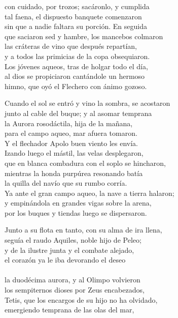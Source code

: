 con cuidado, por trozos; sacáronlo, y cumplida\\
tal faena, el dispuesto banquete comenzaron\\
sin que a nadie faltara su porción. En seguida\\
que saciaron sed y hambre, los mancebos colmaron\\
las cráteras de vino que después repartían,\\
y a todos las primicias de la copa obsequiaron.\\
Los jóvenes aqueos, tras de holgar todo el día,\\
al dios se propiciaron cantándole un hermoso\\
himno, que oyó el Flechero con ánimo gozoso.\par
Cuando el sol se entró y vino la sombra, se acostaron\\
junto al cable del buque; y al asomar temprana\\
la Aurora rosodáctila, hija de la mañana,\\
para el campo aqueo, mar afuera tomaron.\\
Y el flechador Apolo buen viento les envía.\\
Izando luego el mástil, las velas desplegaron,\\
que en blanca combadura con el soplo se hincharon,\\
mientras la honda purpúrea resonando batía\\
la quilla del navío que su rumbo corría.\\
Ya ante el gran campo aqueo, la nave a tierra halaron;\\
y empinándola en grandes vigas sobre la arena,\\
por los buques y tiendas luego se dispersaron.\par
Junto a su flota en tanto, con su alma de ira llena,\\
seguía el raudo Aquiles, noble hijo de Peleo;\\
y de la ilustre junta y el combate alejado,\\
el corazón ya le iba devorando el deseo\\
\\
la duodécima aurora, y al Olimpo volvieron\\
los sempiternos dioses por Zeus encabezados,\\
Tetis, que los encargos de su hijo no ha olvidado,\\
emergiendo temprana de las olas del mar,\\
